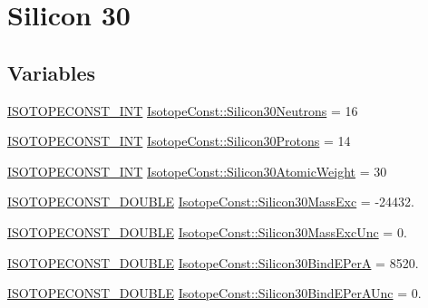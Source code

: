 \hypertarget{group___isotope_const-_silicon-_si30}{}\section{Silicon 30}
\label{group___isotope_const-_silicon-_si30}
\subsection*{Variables}
\begin{DoxyCompactItemize}
\item 
\mbox{\hyperlink{group___isotope_const-_macros_ga5f18360b3e99483a35c32d789e62621c}{I\+S\+O\+T\+O\+P\+E\+C\+O\+N\+S\+T\+\_\+\+I\+NT}} \mbox{\hyperlink{group___isotope_const-_silicon-_si30_ga5a494c87e2695bff82fe709cc00a1082}{Isotope\+Const\+::\+Silicon30\+Neutrons}} = 16
\item 
\mbox{\hyperlink{group___isotope_const-_macros_ga5f18360b3e99483a35c32d789e62621c}{I\+S\+O\+T\+O\+P\+E\+C\+O\+N\+S\+T\+\_\+\+I\+NT}} \mbox{\hyperlink{group___isotope_const-_silicon-_si30_ga06c029ce2418e6127abde7faf115aa86}{Isotope\+Const\+::\+Silicon30\+Protons}} = 14
\item 
\mbox{\hyperlink{group___isotope_const-_macros_ga5f18360b3e99483a35c32d789e62621c}{I\+S\+O\+T\+O\+P\+E\+C\+O\+N\+S\+T\+\_\+\+I\+NT}} \mbox{\hyperlink{group___isotope_const-_silicon-_si30_ga297a58416a4f19cbf7b64a376f206cba}{Isotope\+Const\+::\+Silicon30\+Atomic\+Weight}} = 30
\item 
\mbox{\hyperlink{group___isotope_const-_macros_ga8f45a7272ce02c0b4c65c44636ed719a}{I\+S\+O\+T\+O\+P\+E\+C\+O\+N\+S\+T\+\_\+\+D\+O\+U\+B\+LE}} \mbox{\hyperlink{group___isotope_const-_silicon-_si30_ga330cf71a4db9d6197947f7fd6590e57d}{Isotope\+Const\+::\+Silicon30\+Mass\+Exc}} = -\/24432.
\item 
\mbox{\hyperlink{group___isotope_const-_macros_ga8f45a7272ce02c0b4c65c44636ed719a}{I\+S\+O\+T\+O\+P\+E\+C\+O\+N\+S\+T\+\_\+\+D\+O\+U\+B\+LE}} \mbox{\hyperlink{group___isotope_const-_silicon-_si30_gab287eac365e282f76fc7c5f17b6ffbda}{Isotope\+Const\+::\+Silicon30\+Mass\+Exc\+Unc}} = 0.
\item 
\mbox{\hyperlink{group___isotope_const-_macros_ga8f45a7272ce02c0b4c65c44636ed719a}{I\+S\+O\+T\+O\+P\+E\+C\+O\+N\+S\+T\+\_\+\+D\+O\+U\+B\+LE}} \mbox{\hyperlink{group___isotope_const-_silicon-_si30_ga186966a6c821dd144ef0fa1ae7397bdb}{Isotope\+Const\+::\+Silicon30\+Bind\+E\+PerA}} = 8520.
\item 
\mbox{\hyperlink{group___isotope_const-_macros_ga8f45a7272ce02c0b4c65c44636ed719a}{I\+S\+O\+T\+O\+P\+E\+C\+O\+N\+S\+T\+\_\+\+D\+O\+U\+B\+LE}} \mbox{\hyperlink{group___isotope_const-_silicon-_si30_ga3b634297fc1a69e98535b0c099abc6e6}{Isotope\+Const\+::\+Silicon30\+Bind\+E\+Per\+A\+Unc}} = 0.

\end{DoxyCompactItemize}
